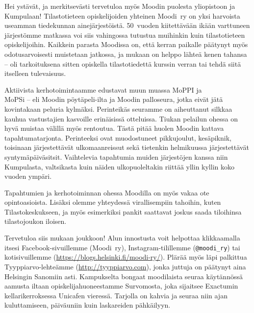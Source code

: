 \documentclass[a5paper, 8pt, twocolumn]{book} %
\numberwithin{equation}{section}
\begin{document}
Hei ystävät, ja merkitsevästi tervetuloa myös Moodin puolesta yliopistoon ja Kumpulaan! Tilastotieteen opiskelijoiden yhteinen Moodi~ry on yksi harvoista useamman tiedekunnan ainejärjestöistä. 50~vuoden kiitettävään ikään varttuneen järjestömme matkassa voi siis vahingossa tutustua muihinkin kuin tilastotieteen opiskelijoihin. Kaikkein parasta Moodissa on, että kerran paikalle päätynyt myös odotusarvoisesti muistetaan jatkossa, ja mukaan on helppo lähteä kenen tahansa -- oli tarkoituksena sitten opiskella tilastotiedettä kurssin verran tai tehdä siitä itselleen tulevaisuus.

Aktiivista kerhotoimintaamme edustavat muun muassa MoPPI ja \\MoPSi -- eli Moodin pöytäpeli-ilta ja Moodin palloseura, jotka eivät jätä kovintakaan peluria kylmäksi. Perinteikäs seuramme on aiheuttanut silkkaa kauhua vastustajien kasvoille erinäisissä otteluissa. Tiukan pelailun ohessa on hyvä muistaa välillä myös rentoutua. Tästä pitää huolen Moodin kattava tapahtumatarjonta. Perinteeksi ovat muodostuneet pikkujoulut, kesäpiknik, toisinaan järjestettävät ulkomaanreissut sekä tietenkin helmikuussa järjestettävät syntymäpäiväsitsit. Vaihtelevia tapahtumia muiden järjestöjen kanssa niin Kumpulasta, valtsikasta kuin näiden ulkopuoleltakin riittää yllin kyllin koko vuoden ympäri.

Tapahtumien ja kerhotoiminnan ohessa Moodilla on myös vakaa ote opintoasioista. Lisäksi olemme yhteydessä virallisempiin tahoihin, kuten Tilastokeskukseen, ja myös esimerkiksi pankit saattavat joskus saada tiloihinsa tilastojoukon iloisen.

Tervetuloa siis mukaan joukkoon! Alun innostusta voit helpottaa klikkaamalla itsesi Facebook-sivuillemme (Moodi~ry), Instagram-tilillemme (\texttt{@moodi\_ry}) tai kotisivuillemme (\url{https://blogs.helsinki.fi/moodi-ry/}). Plärää myös läpi palkittua Tyyppiarvo-lehteämme (\url{http://tyyppiarvo.com}), jonka juttuja on päätynyt aina Helsingin Sanomiin asti. Kampukselta bongaat moodilaista seuraa käytännössä aamusta iltaan opiskelijahuoneestamme Survomosta, joka sijaitsee Exactumin kellarikerroksessa Unicafen vieressä. Tarjolla on kahvia ja seuraa niin ajan kuluttamiseen, päiväuniin kuin laskareiden pähkäilyyn.
\end{document}
